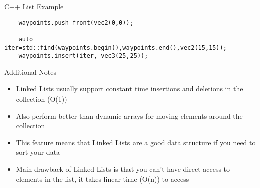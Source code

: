 \begin{frame}[fragile]{C++ List
	Example}
\begin{lstlisting}
	waypoints.push_front(vec2(0,0));
	
	auto iter=std::find(waypoints.begin(),waypoints.end(),vec2(15,15));
	waypoints.insert(iter, vec3(25,25));
\end{lstlisting}
\end{frame}

\begin{frame}{Additional Notes}
	\begin{itemize}
		\pause \item Linked Lists usually support constant time insertions and deletions in the collection (O(1))
		\pause \item Also perform better than dynamic arrays for moving elements around the collection
		\pause \item This feature means that Linked Lists are a good data structure if you need to sort your data
		\pause \item Main drawback of Linked Lists is that you can't have direct access to elements in the list, it takes linear time (O(n)) to access
	\end{itemize}
\end{frame}